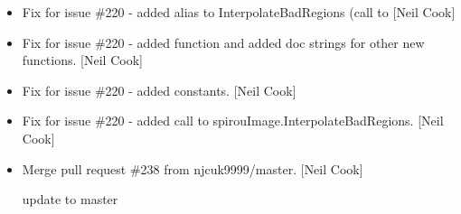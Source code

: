 \documentclass[a4paper,10pt,english]{report}
\begin{document}
\begin{itemize}
\item {} 
Fix for issue \#220 - added alias to InterpolateBadRegions (call to
 {[}Neil Cook{]}

\item {} 
Fix for issue \#220 - added  function and added doc
strings for other new functions. {[}Neil Cook{]}

\item {} 
Fix for issue \#220 - added  constants. {[}Neil Cook{]}

\item {} 
Fix for issue \#220 - added call to spirouImage.InterpolateBadRegions.
{[}Neil Cook{]}

\item {} 
Merge pull request \#238 from njcuk9999/master. {[}Neil Cook{]}

update to master

\end{itemize}
\end{document}
